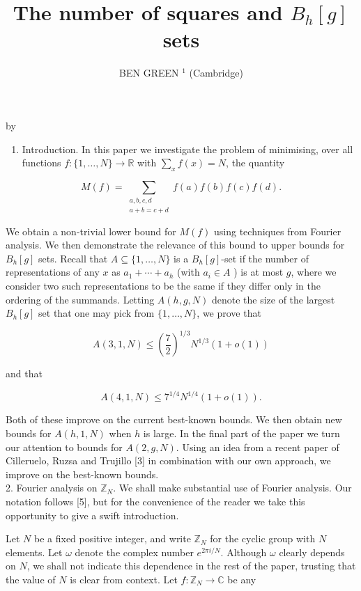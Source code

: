 \documentclass[10pt]{article}
\title{The number of squares and $B_{h}[g]$ sets }
\author{BEN GREEN ${ }^{1}$ (Cambridge)}
\date{}
\begin{document}
\maketitle
by



\begin{enumerate}
  \item Introduction. In this paper we investigate the problem of minimising, over all functions $f:\{1, \ldots, N\} \rightarrow \mathbb{R}$ with $\sum_{x} f(x)=N$, the quantity
\end{enumerate}

$$
M(f)=\sum_{\substack{a, b, c, d \\ a+b=c+d}} f(a) f(b) f(c) f(d) .
$$

We obtain a non-trivial lower bound for $M(f)$ using techniques from Fourier analysis. We then demonstrate the relevance of this bound to upper bounds for $B_{h}[g]$ sets. Recall that $A \subseteq\{1, \ldots, N\}$ is a $B_{h}[g]$-set if the number of representations of any $x$ as $a_{1}+\cdots+a_{h}$ (with $a_{i} \in A$ ) is at most $g$, where we consider two such representations to be the same if they differ only in the ordering of the summands. Letting $A(h, g, N)$ denote the size of the largest $B_{h}[g]$ set that one may pick from $\{1, \ldots, N\}$, we prove that

$$
A(3,1, N) \leq\left(\frac{7}{2}\right)^{1 / 3} N^{1 / 3}(1+o(1))
$$

and that

$$
A(4,1, N) \leq 7^{1 / 4} N^{1 / 4}(1+o(1)) .
$$

Both of these improve on the current best-known bounds. We then obtain new bounds for $A(h, 1, N)$ when $h$ is large. In the final part of the paper we turn our attention to bounds for $A(2, g, N)$. Using an idea from a recent paper of Cilleruelo, Ruzsa and Trujillo [3] in combination with our own approach, we improve on the best-known bounds.\\
2. Fourier analysis on $\mathbb{Z}_{N}$. We shall make substantial use of Fourier analysis. Our notation follows [5], but for the convenience of the reader we take this opportunity to give a swift introduction.

Let $N$ be a fixed positive integer, and write $\mathbb{Z}_{N}$ for the cyclic group with $N$ elements. Let $\omega$ denote the complex number $e^{2 \pi i / N}$. Although $\omega$ clearly depends on $N$, we shall not indicate this dependence in the rest of the paper, trusting that the value of $N$ is clear from context. Let $f: \mathbb{Z}_{N} \rightarrow \mathbb{C}$ be any
\end{document}
